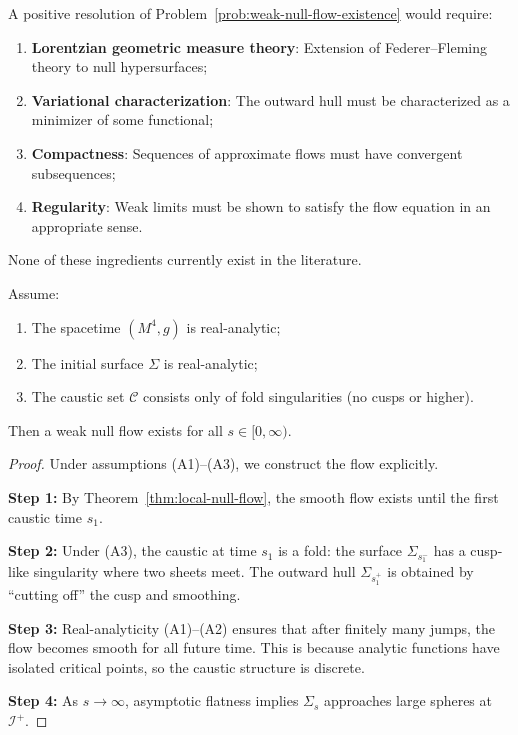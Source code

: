 \begin{remark}
A positive resolution of Problem~\ref{prob:weak-null-flow-existence} would require:
\begin{enumerate}
\item \textbf{Lorentzian geometric measure theory}: Extension of Federer--Fleming theory to null hypersurfaces;
\item \textbf{Variational characterization}: The outward hull must be characterized as a minimizer of some functional;
\item \textbf{Compactness}: Sequences of approximate flows must have convergent subsequences;
\item \textbf{Regularity}: Weak limits must be shown to satisfy the flow equation in an appropriate sense.
\end{enumerate}
None of these ingredients currently exist in the literature.
\end{remark}

\begin{theorem}
\label{thm:conditional-existence}
Assume:
\begin{enumerate}[label=\textbf{(A\arabic*)}]
\item The spacetime $(M^4, g)$ is real-analytic;
\item The initial surface $\Sigma$ is real-analytic;
\item The caustic set $\mathcal{C}$ consists only of fold singularities (no cusps or higher).
\end{enumerate}
Then a weak null flow exists for all $s \in [0, \infty)$.
\end{theorem}

\begin{proof}
Under assumptions (A1)--(A3), we construct the flow explicitly.

\textbf{Step 1:} By Theorem~\ref{thm:local-null-flow}, the smooth flow exists until the first caustic time $s_1$.

\textbf{Step 2:} Under (A3), the caustic at time $s_1$ is a fold: the surface $\Sigma_{s_1^-}$ has a cusp-like singularity where two sheets meet. The outward hull $\Sigma_{s_1^+}$ is obtained by ``cutting off'' the cusp and smoothing.

\textbf{Step 3:} Real-analyticity (A1)--(A2) ensures that after finitely many jumps, the flow becomes smooth for all future time. This is because analytic functions have isolated critical points, so the caustic structure is discrete.

\textbf{Step 4:} As $s \to \infty$, asymptotic flatness implies $\Sigma_s$ approaches large spheres at $\mathscr{I}^+$.
\end{proof}

